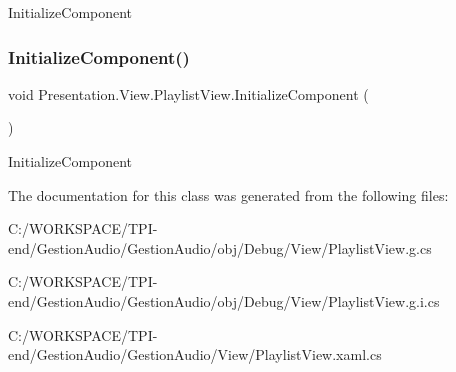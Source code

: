 Initialize\+Component 

\mbox{\label{class_presentation_1_1_view_1_1_playlist_view_a025146640bbe45b42da5f72da40f3cc6}} 
\subsubsection{\texorpdfstring{Initialize\+Component()}{InitializeComponent()}\hspace{0.1cm}{\footnotesize\ttfamily [4/4]}}
{\footnotesize\ttfamily void Presentation.\+View.\+Playlist\+View.\+Initialize\+Component (\begin{DoxyParamCaption}{ }\end{DoxyParamCaption})}



Initialize\+Component 



The documentation for this class was generated from the following files\+:\begin{DoxyCompactItemize}
\item 
C\+:/\+W\+O\+R\+K\+S\+P\+A\+C\+E/\+T\+P\+I-\/end/\+Gestion\+Audio/\+Gestion\+Audio/obj/\+Debug/\+View/Playlist\+View.\+g.\+cs\item 
C\+:/\+W\+O\+R\+K\+S\+P\+A\+C\+E/\+T\+P\+I-\/end/\+Gestion\+Audio/\+Gestion\+Audio/obj/\+Debug/\+View/Playlist\+View.\+g.\+i.\+cs\item 
C\+:/\+W\+O\+R\+K\+S\+P\+A\+C\+E/\+T\+P\+I-\/end/\+Gestion\+Audio/\+Gestion\+Audio/\+View/Playlist\+View.\+xaml.\+cs\end{DoxyCompactItemize}
